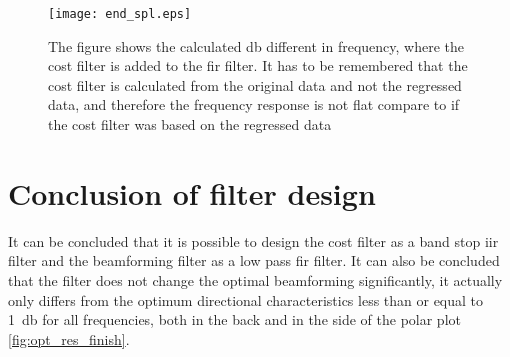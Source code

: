 \begin{figure}[H]
	\centering
	\texttt{[image: end\_spl.eps]}
	\caption{The figure shows the calculated \si{\decibel} different in frequency, where the cost filter is added to the \gls{fir} filter. It has to be remembered that the cost filter is calculated from the original data and not the regressed data, and therefore the frequency response is not flat compare to if the cost filter was based on the regressed data}
		\label{fig:end_spl}
\end{figure}



\section{Conclusion of filter design}
It can be concluded that it is possible to design the cost filter as a band stop \gls{iir} filter and the beamforming filter as a low pass \gls{fir} filter. It can also be concluded that the filter does not change the optimal beamforming significantly, it actually only differs from the optimum directional characteristics less than or equal to \SI{1}{\decibel} for all frequencies, both in the back and in the side of the polar plot \autoref{fig:opt_res_finish}.





